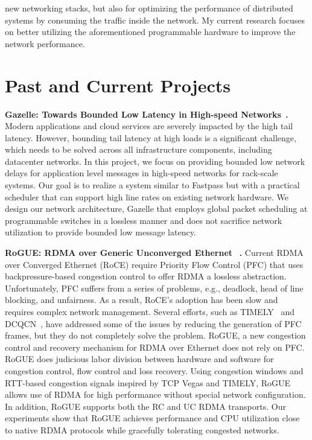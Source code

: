 \documentclass[10pt]{article}
\begin{document}
new networking stacks, but also for optimizing the performance of distributed systems by consuming 
the traffic inside the network.
My current research focuses on better utilizing the aforementioned programmable hardware to improve the network performance. 
\section*{Past and Current Projects}
\textbf{Gazelle: Towards Bounded Low Latency in High-speed Networks}~\cite{Gazelle}\textbf{.}
Modern applications and cloud services are severely impacted by the high tail
latency.  However, bounding tail latency at high loads is a
significant challenge, which needs to be solved across all infrastructure
components, including datacenter networks.  In this project, we focus on
providing bounded low network delays for application level
messages in high-speed networks for rack-scale systems.  Our goal is
to realize a system similar to Fastpass but with a practical scheduler
that can support high line rates on existing network hardware.
We design our network architecture, Gazelle that employs
global packet scheduling at programmable switches in a lossless manner
and does not sacrifice network utilization to provide bounded low message
latency.

\textbf{RoGUE: RDMA over Generic Unconverged Ethernet}~
\cite{Le:2018:rogue}\textbf{.} Current RDMA over Converged Ethernet (RoCE) require Priority Flow
Control (PFC) that uses backpressure-based congestion
control to offer RDMA a lossless abstraction. Unfortunately,
PFC suffers from a series of problems, e.g., deadlock, head of line blocking, and unfairness. 
As a result,
RoCE’s adoption has been slow and requires complex
network management. Several efforts, such as TIMELY~\cite{Mittal:2015:TRC}
and DCQCN~\cite{Zhu:2015:CCL}, have addressed some of the issues by reducing
the generation of PFC frames, but they do not completely
solve the problem.
RoGUE, a new congestion control and
recovery mechanism for RDMA over Ethernet does
not rely on PFC. RoGUE does judicious labor division 
between hardware and software for congestion control, flow control and loss recovery.  
Using congestion windows and RTT-based
congestion signals inspired by TCP Vegas and
TIMELY, RoGUE allows use of RDMA for high performance
without special network configuration. In addition,
RoGUE supports both the RC and UC RDMA
transports. Our experiments show that RoGUE achieves
performance and CPU utilization close to native RDMA
protocols while gracefully tolerating congested networks.
\end{document}
